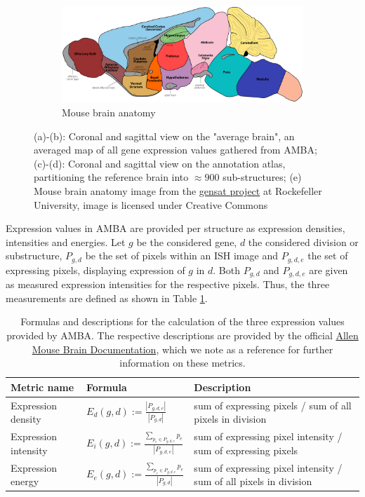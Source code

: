 \documentclass[]{article}
\begin{document}
\begin{figure}
	\begin{subfigure}{0.9\textwidth}
		\centering
		\includegraphics[width=.8\linewidth]{figures/ADULT_ATLAS.jpg}
		\caption{Mouse brain anatomy }
		\label{fig:mousebrain_anatomy}
	\end{subfigure}
	\caption[Average, annotation and anatomy atlas]{(a)-(b): Coronal and sagittal view on the "average brain", an averaged map of all gene expression values gathered from AMBA; (c)-(d): Coronal and sagittal view on the annotation atlas, partitioning the reference brain into $\approx900$ sub-structures; (e) Mouse brain anatomy image from the \href{http://www.gensat.org/}{gensat project} at Rockefeller University, image is licensed under Creative Commons}
	\label{fig:CCF_images}
\end{figure}

Expression values in AMBA are provided per structure as expression densities, intensities and energies. Let $g$ be the considered gene, $d$ the considered division or substructure, $P_{g,d}$ be the set of pixels within an ISH image and $P_{g,d,e}$ the set of expressing pixels, displaying expression of $g$ in $d$. Both $P_{g,d}$ and $P_{g,d,e}$ are given as measured expression intensities for the respective pixels. Thus, the three measurements are defined as shown in Table \ref{tab:expr_values}.

\begin{table}
	\renewcommand{\arraystretch}{3}
	\begin{tabular}{llp{8cm}}
		Metric name&Formula&Description\\
		\hline
		Expression density&$E_d(g,d):=\frac{|P_{g,d,e}|}{|P_{g,d}|}$&sum of expressing pixels / sum of all pixels in division\\
		Expression intensity&$E_i(g,d):=\frac{\sum_{p_e\in P_{g,d,e}} p_e}{|P_{g,d,e}|}$&sum of expressing pixel intensity / sum of expressing pixels\\
		Expression energy&$E_e(g,d):=\frac{\sum_{p_e\in P_{g,d,e}} p_e}{|P_{g,d}|}$&sum of expressing pixel intensity / sum of all pixels in division\\
	\end{tabular}

	\caption{Formulas and descriptions for the calculation of the three expression values provided by AMBA. The respective descriptions are provided by the official \href{http://help.brain-map.org/download/attachments/2818169/InformaticsDataProcessing.pdf?version=1&modificationDate=1319667590884&api=v2}{Allen Mouse Brain Documentation}, which we note as a reference for further information on these metrics.}
	\label{tab:expr_values}
\end{table}
\end{document}
